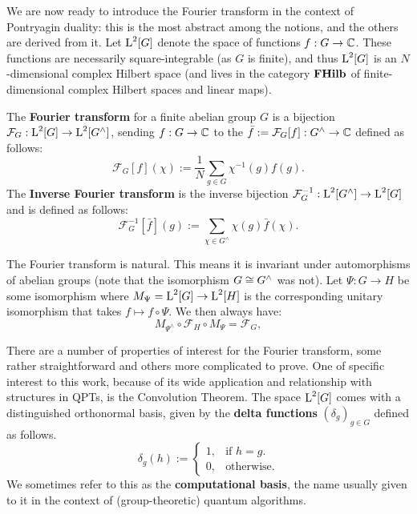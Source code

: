 \newcommand{\FourierTransformSym}[1]{\mathcal{F}_{#1}}
\newcommand{\InverseFourierTransformSym}[1]{\mathcal{F}_{#1}^{-1}}
\newcommand{\FourierTransform}[1]{\mathcal{F}_G[#1]}
\newcommand{\InverseFourierTransform}[1]{\mathcal{F}_G^{-1}[#1]}

We are now ready to introduce the Fourier transform in the context of Pontryagin duality: this is the most abstract among the notions, and the others are derived from it. Let $\operatorname{L}^2[G]$ denote the space of functions $f:G\to \mathbb{C}$. These functions are necessarily square-integrable (as $G$ is finite), and thus $\operatorname{L}^2[G]$ is an $N$-dimensional complex Hilbert space (and lives in the category $\mathbf{FHilb}$ of finite-dimensional complex Hilbert spaces and linear maps). 

\begin{defn}
The \textbf{Fourier transform} for a finite abelian group $G$ is a bijection $\mathcal{F}_G:\operatorname{L}^2[G]\rightarrow\operatorname{L}^2[G^\wedge]$, sending $f:G\to\mathbb{C}$ to the $\bar{f}:=\FourierTransform{f}:G^\wedge\to\complexs$ defined as follows:
\begin{equation}\label{eqn:DefTraditionalFT}
  \FourierTransform{f}(\chi) := \frac{1}{N}\sum_{g \in G}\chi^{-1}(g)f(g).
\end{equation}
The \textbf{Inverse Fourier transform} is the inverse bijection $\mathcal{F}_G^{-1}: \operatorname{L}^2[G^\wedge] \rightarrow \operatorname{L}^2[G]$ and is defined as follows:
\begin{equation}\label{eqn:DefTraditionalInverseFT}
  \InverseFourierTransform{\bar{f}}(g) := \sum_{\chi \in G^\wedge}\chi(g)\bar{f}(\chi).
\end{equation}
\end{defn}

The Fourier transform is natural.  This means it is invariant under automorphisms of abelian groups (note that the isomorphism $G \cong G^\wedge$ was not). Let $\Psi : G \rightarrow H$ be some isomorphism where $M_\Psi = \operatorname{L}^2[G] \rightarrow \operatorname{L}^2[H]$ is the corresponding unitary isomorphism that takes $f\mapsto f\circ \Psi$. We then always have:
\begin{equation}\label{eqn:FTcanonicity}
  M_{\Psi^\wedge} \circ \mathcal{F}_H \circ M_\Psi =  \mathcal{F}_G,
\end{equation}

There are a number of properties of interest for the Fourier transform, some rather straightforward and others more complicated to prove. One of specific interest to this work, because of its wide application and relationship with structures in QPTs, is the Convolution Theorem. The space $\operatorname{L}^2[G]$ comes with a distinguished orthonormal basis, given by the \textbf{delta functions} $(\delta_g)_{g\in G}$ defined as follows.
\begin{equation}
\label{eqn:computationalBasis}
  \delta_g(h):=\begin{cases}
    1, & \text{if $h=g$}.\\
    0, & \text{otherwise}.
  \end{cases}
\end{equation}
We sometimes refer to this as the \textbf{computational basis}, the name usually given to it in the context of (group-theoretic) quantum algorithms.

